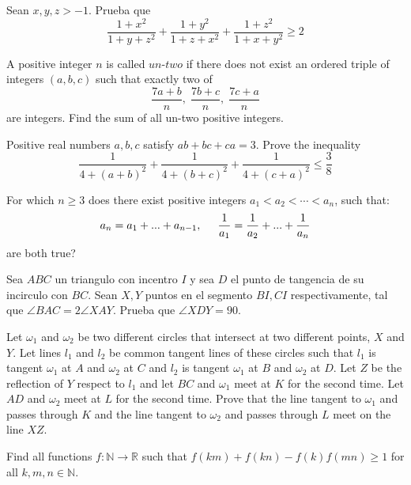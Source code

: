 \documentclass[11pt]{scrartcl}
\begin{document}
\begin{problem}
Sean $x,y,z >-1$. Prueba que 
\[\frac{1+x^2}{1+y+z^2}+\frac{1+y^2}{1+z+x^2}+\frac{1+z^2}{1+x+y^2} \geq 2\]
\end{problem}
\begin{problem}[DIME 2022/11]
A positive integer $n$ is called $\textit{un-two}$ if there does not exist an ordered triple of integers $(a,b,c)$ such that exactly two of$$\dfrac{7a+b}{n},\;\dfrac{7b+c}{n},\;\dfrac{7c+a}{n}$$are integers. Find the sum of all un-two positive integers.
\end{problem}
\begin{problem}
Positive real numbers $a, b,c$ satisfy $ab + bc+ ca = 3$. Prove the inequality$$\frac{1}{4+(a+b)^2}+\frac{1}{4+(b+c)^2}+\frac{1}{4+(c+a)^2}\le \frac{3}{8}$$
\end{problem}
\begin{problem}
For which $n\ge 3$ does there exist positive integers $a_1<a_2<\cdots <a_n$, such that:$$a_n=a_1+...+a_{n-1}, \hspace{0.5cm} \frac{1}{a_1}=\frac{1}{a_2}+...+\frac{1}{a_n}$$are both true?
\end{problem}
\begin{problem}
Sea $ABC$ un triangulo con incentro $I$ y sea $D$ el punto de tangencia de su incirculo con $BC$. Sean $X,Y$ puntos en el segmento $BI,CI$ respectivamente, tal que $\angle BAC=2\angle XAY$. Prueba que $\angle XDY=90$. 
\end{problem}
\begin{problem}
Let $\omega_1$ and $\omega_2$ be two different circles that intersect at two different points, $X$ and $Y$. Let lines $l_1$ and $l_2$ be common tangent lines of these circles such that $l_1$ is tangent $\omega_1$ at $A$ and $\omega_2$ at $C$ and $l_2$ is tangent $\omega_1$ at $B$ and $\omega_2$ at $D$. Let $Z$ be the reflection of $Y$ respect to $l_1$ and let $BC$ and $\omega_1$ meet at $K$ for the second time. Let $AD$ and $\omega_2$ meet at $L$ for the second time. Prove that the line tangent to $\omega_1$ and passes through $K$ and the line tangent to $\omega_2$ and passes through $L$ meet on the line $XZ$.
\end{problem}
\begin{problem}[Sudafrica 2012/6]
   Find all functions $f:\mathbb{N}\to\mathbb{R}$ such that
$f(km)+f(kn)-f(k)f(mn)\ge 1$
for all $k,m,n\in\mathbb{N}$.
\end{problem}
\end{document}
